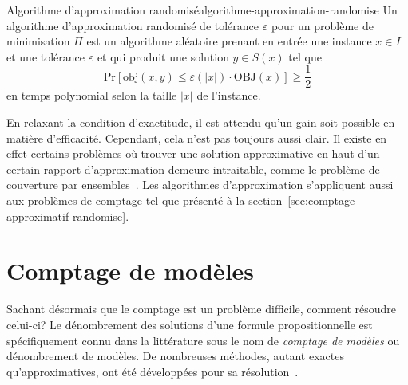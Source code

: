 \begin{subtheorem}{Algorithme d'approximation randomisé}{algorithme-approximation-randomise}
    Un algorithme d'approximation randomisé de tolérance $\varepsilon$ pour un problème de minimisation $\Pi$ est un algorithme aléatoire prenant en entrée une instance $x \in I$ et une tolérance $\varepsilon$ et qui produit une solution $y \in S(x)$ tel que
    \begin{equation*}
        \mathrm{ Pr } [\text{obj}(x, y) \leq \varepsilon(\lvert x \rvert ) \cdot \text{OBJ}(x)] \geq \frac{1}{2}
    \end{equation*}
    en temps polynomial selon la taille $\lvert x \rvert $ de l'instance.
\end{subtheorem}

En relaxant la condition d'exactitude, il est attendu qu'un gain soit possible en matière d'efficacité. Cependant, cela n'est pas toujours aussi clair. Il existe en effet certains problèmes où trouver une solution approximative en haut d'un certain rapport d'approximation demeure intraitable, comme le problème de couverture par ensembles~\cite{lundHardnessApproximatingMinimization1994}. Les algorithmes d'approximation s'appliquent aussi aux problèmes de comptage tel que présenté à la section~\ref{sec:comptage-approximatif-randomise}.


\section{Comptage de modèles}
\label{sec:comptage-de-modeles}

Sachant désormais que le comptage est un problème difficile, comment résoudre celui-ci? Le dénombrement des solutions d'une formule propositionnelle est spécifiquement connu dans la littérature sous le nom de \textit{comptage de modèles} ou dénombrement de modèles. De nombreuses méthodes, autant exactes qu'approximatives, ont été développées pour sa résolution~\cite{biereHandbookSatisfiability2009}. 

